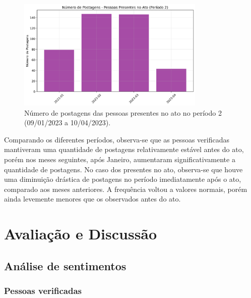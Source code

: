 \documentclass[manuscript,screen,review]{acmart}
\begin{document}
\begin{figure}[h]
\centering
\includegraphics[width=0.8\textwidth]{figura28_postagens_presentes_periodo2.png}
\caption{Número de postagens das pessoas presentes no ato no período 2 (09/01/2023 a 10/04/2023).}
\label{fig:figura28}
\end{figure}

Comparando os diferentes períodos, observa-se que as pessoas verificadas mantiveram uma quantidade de postagens relativamente estável antes do ato, porém nos meses seguintes, após Janeiro, aumentaram significativamente a quantidade de postagens. No caso dos presentes no ato, observa-se que houve uma diminuição drástica de postagens no período imediatamente após o ato, comparado aos meses anteriores. A frequência voltou a valores normais, porém ainda levemente menores que os observados antes do ato.

\section{Avaliação e Discussão}

\subsection{Análise de sentimentos}

\subsubsection{Pessoas verificadas}
\end{document}
